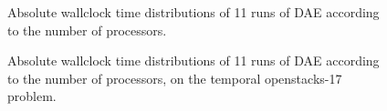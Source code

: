 \documentclass{sig-alternate}
\begin{document}

\begin{figure}[htpb]
  \begin{center}
    \hfill
  \end{center}
  \caption{Absolute wallclock time distributions of 11 runs of DAE according to
  the number of processors.}
  \label{fig:static_vs_dynamic}
\end{figure}


\begin{figure}[htpb]
  \begin{center}
    \hfill
  \end{center}
  \caption{Absolute wallclock time distributions of 11 runs of DAE according to
  the number of processors, on the temporal openstacks-17 problem.}
  \label{fig:static_vs_dynamic}
\end{figure}
\end{document}
